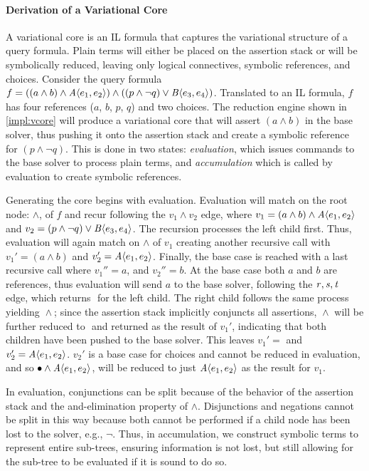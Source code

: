 \paragraph{Derivation of a Variational Core}%
\label{ssec:impl:accum}

A variational core is an IL formula that captures the variational structure of
a query formula. Plain terms will either be placed on the assertion stack or
will be symbolically reduced, leaving only logical connectives, symbolic
references, and choices.
%
Consider the query formula $f = ((a \wedge b) \wedge \chc[A]{e_{1}, e_{2}}) \wedge
((p \wedge \neg q) \vee \chc[B]{e_{3}, e_{4}})$. Translated to an IL formula,
$f$ has four references ($a$, $b$, $p$, $q$) and two choices. The reduction
engine shown in \autoref{impl:vcore} will produce a variational core that will
assert $(a \wedge b)$ in the base solver, thus pushing it onto the assertion
stack and create a symbolic reference for $(p \wedge \neg q)$. This is done in
two states: \emph{evaluation}, which issues commands to the base solver to
process plain terms, and \emph{accumulation} which is called by evaluation to
create symbolic references.

Generating the core begins with evaluation. Evaluation will match on the root
node: $\wedge$, of $f$ and recur following the $v_1 \wedge v_2$ edge, where
%
$v_1=(a\wedge b)\wedge\chc[A]{e_1,e_2}$ and
$v_2=(p\wedge \neg q) \vee \chc[B]{e_3, e_4}$.
%
The recursion processes the left child first. Thus, evaluation will again
match on $\wedge$ of $v_{1}$ creating another recursive call with $v_{1}' =
(a\wedge b)$ and $v_{2}' = \chc[A]{e_1,e_2}$. Finally, the base case is reached
with a last recursive call where $v_{1}'' = a$, and $v_{2}'' = b$. At the base
case both $a$ and $b$ are references, thus evaluation will send $a$ to the
base solver, following the $\mathit{r, s, t}$ edge, which returns $\unit{}$ for
the left child. The right child follows the same process yielding $\unit{}
\wedge \unit{}$; since the assertion stack implicitly conjuncts all assertions,
$\unit{} \wedge \unit{}$ will be further reduced to $\unit{}$ and returned as
the result of $v_{1}'$,
indicating that both children have been pushed to the base solver. This
leaves $v_{1}' = \unit{}$ and $v_{2}' = \chc[A]{e_1,e_2}$. $v_{2}'$ is a base
case for choices and cannot be reduced in evaluation, and so $\unit{} \wedge
\chc[A]{e_1,e_2}$, will be reduced to just $\chc[A]{e_1,e_2}$ as the result for
$v_{1}$.

In evaluation, conjunctions can be split because of the behavior of the
assertion stack and the and-elimination property of $\wedge$. Disjunctions and
negations cannot be split in this way because both cannot be performed if a child
node has been lost to the solver, e.g., $\neg \unit{}$. Thus, in accumulation, we
construct symbolic terms to represent entire sub-trees, ensuring information is
not lost, but still allowing for the sub-tree to be evaluated if it is sound to
do so.

